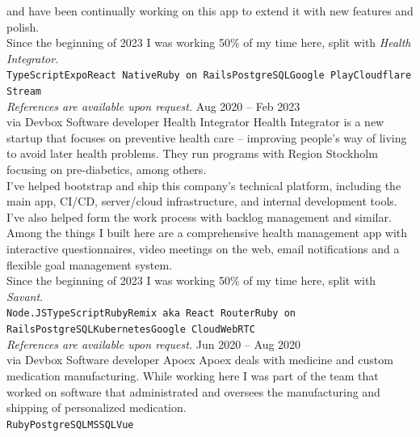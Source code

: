\documentclass[9pt]{developercv} %
\begin{document}
\begin{entrylist}
{    and have been continually working on this app to extend it with new
    features and polish.\\
    Since the beginning of 2023 I was working 50\% of my time here, split with
    \textit{Health Integrator}.\\
      \texttt{TypeScript}\slashsep\texttt{Expo}\slashsep\texttt{React
      Native}\slashsep\texttt{Ruby on
      Rails}\slashsep\texttt{PostgreSQL}\slashsep\texttt{Google
      Play}\slashsep\texttt{Cloudflare Stream}\\
    \textit{References are available upon request.}
    }
  \entry
    {Aug 2020 -- Feb 2023\\\footnotesize{via Devbox}}
    {Software developer}
    {Health Integrator}
    {Health Integrator is a new startup that focuses on preventive health care
    -- improving people's way of living to avoid later health problems. They
    run programs with Region Stockholm focusing on pre-diabetics, among
    others.\\ I've helped bootstrap and ship this company's technical platform,
    including the main app, CI/CD, server/cloud infrastructure, and internal
    development tools. I've also helped form the work process with backlog
    management and similar.\\
    Among the things I built here are a comprehensive health management app with
    interactive questionnaires, video meetings on the web, email notifications
    and a flexible goal management system.\\
    Since the beginning of 2023 I was working 50\% of my time here, split with
    \textit{Savant}.\\
      \texttt{Node.JS}\slashsep\texttt{TypeScript}\slashsep\texttt{Ruby}\slashsep\texttt{Remix
      aka React Router}\slashsep\texttt{Ruby on
      Rails}\slashsep\texttt{PostgreSQL}\slashsep\texttt{Kubernetes}\slashsep\texttt{Google
      Cloud}\slashsep\texttt{WebRTC}\\
    \textit{References are available upon request.}
    }
  \entry
    {Jun 2020 -- Aug 2020\\\footnotesize{via Devbox}}
    {Software developer}
    {Apoex}
    {Apoex deals with medicine and custom medication manufacturing. While
      working here I was part of the team that worked on software that
      administrated and oversees the manufacturing and shipping of personalized
      medication.\\
      \texttt{Ruby}\slashsep\texttt{PostgreSQL}\slashsep\texttt{MSSQL}\slashsep\texttt{Vue}}

\end{entrylist}
\end{document}
